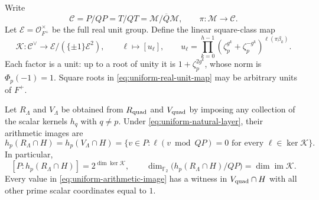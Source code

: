 Write
\[
 \mathscr C=P/QP=T/QT=\mathscr M/\overline Q\mathscr M,
 \qquad \pi:\mathscr M\to\mathscr C.
\]
Let \(\mathscr E=\mathcal O_{F^+}^{\times}\) be the full real
unit group. Define the linear square-class map
\begin{equation}
 \mathscr K:\mathscr C^\vee\longrightarrow
       \mathscr E/(\{\pm1\}\mathscr E^2),\qquad
 \ell\longmapsto[u_\ell],\qquad
 u_\ell=\prod_{k=0}^{h-1}
  (\zeta_p^{g^k}+\zeta_p^{-g^k})^{\ell(\pi\beta_k)}.
 \label{eq:uniform-real-unit-map}
\end{equation}
Each factor is a unit: up to a root of unity it is
\(1+\zeta_p^{2g^k}\), whose norm is \(\Phi_p(-1)=1\).
Square roots in \eqref{eq:uniform-real-unit-map} may be arbitrary
units of \(F^+\).

\begin{theorem}
\label{thm:uniform-arithmetic-cm-image}
Let \(R_\Lambda\) and \(V_\Lambda\) be obtained from
\(R_{\rm quad}\) and \(V_{\rm quad}\) by imposing any collection
of the scalar kernels \(h_q\) with \(q\ne p\).
Under \eqref{eq:uniform-natural-layer}, their arithmetic images are
\begin{equation}
 h_p(R_\Lambda\cap H)=h_p(V_\Lambda\cap H)
  =\{v\in P:\ell(v\bmod QP)=0\text{ for every }
                         \ell\in\ker\mathscr K\}.
 \label{eq:uniform-arithmetic-image}
\end{equation}
In particular,
\[
 [P:h_p(R_\Lambda\cap H)]=2^{\dim\ker\mathscr K},\qquad
 \dim_{\mathbb F_2}\bigl(h_p(R_\Lambda\cap H)/QP\bigr)
                      =\dim\operatorname{im}\mathscr K.
\]
Every value in \eqref{eq:uniform-arithmetic-image} has a witness
in \(V_{\rm quad}\cap H\) with all other prime scalar coordinates
equal to \(1\).
\end{theorem}

